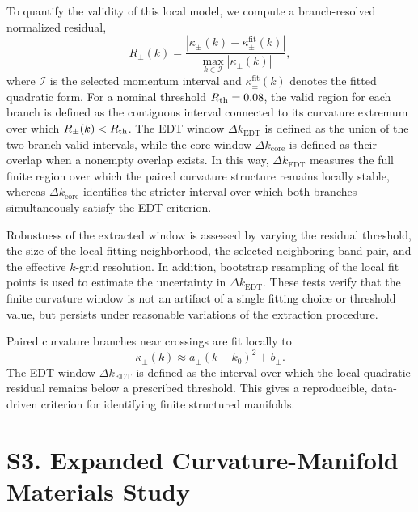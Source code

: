 \documentclass[12pt]{article}
\begin{document}
To quantify the validity of this local model, we compute a branch-resolved normalized residual,
\begin{equation}
R_\pm(k)
=
\frac{
\left|\kappa_\pm(k)-\kappa_\pm^{\mathrm{fit}}(k)\right|
}{
\max_{k\in\mathcal{I}}\left|\kappa_\pm(k)\right|
},
\end{equation}
where \(\mathcal{I}\) is the selected momentum interval and \(\kappa_\pm^{\mathrm{fit}}(k)\) denotes the fitted quadratic form. For a nominal threshold \(R_{\rm th}=0.08\), the valid region for each branch is defined as the contiguous interval connected to its curvature extremum over which \(R_\pm(k)<R_{\rm th}\). The EDT window \(\Delta k_{\mathrm{EDT}}\) is defined as the union of the two branch-valid intervals, while the core window \(\Delta k_{\mathrm{core}}\) is defined as their overlap when a nonempty overlap exists. In this way, \(\Delta k_{\mathrm{EDT}}\) measures the full finite region over which the paired curvature structure remains locally stable, whereas \(\Delta k_{\mathrm{core}}\) identifies the stricter interval over which both branches simultaneously satisfy the EDT criterion.

Robustness of the extracted window is assessed by varying the residual threshold, the size of the local fitting neighborhood, the selected neighboring band pair, and the effective \(k\)-grid resolution. In addition, bootstrap resampling of the local fit points is used to estimate the uncertainty in \(\Delta k_{\mathrm{EDT}}\). These tests verify that the finite curvature window is not an artifact of a single fitting choice or threshold value, but persists under reasonable variations of the extraction procedure.


Paired curvature branches near crossings are fit locally to
\begin{equation}
\kappa_\pm(k)\approx a_\pm(k-k_0)^2+b_\pm .
\end{equation}
The EDT window $\Delta k_{\mathrm{EDT}}$ is defined as the interval over which
the local quadratic residual remains below a prescribed threshold. This gives a
reproducible, data-driven criterion for identifying finite structured manifolds.

\section*{S3. Expanded Curvature-Manifold Materials Study}
\end{document}
